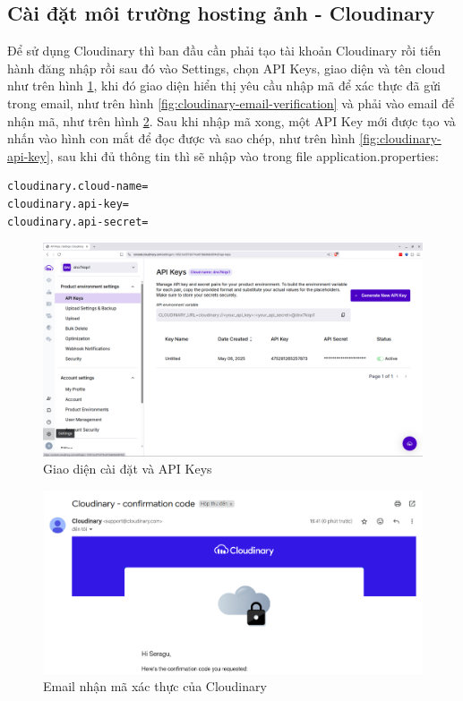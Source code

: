 \documentclass[../BTL.tex]{subfiles}
\begin{document}
\subsection{ Cài đặt môi trường hosting ảnh - Cloudinary}
Để sử dụng Cloudinary thì ban đầu cần phải tạo tài khoản Cloudinary rồi tiến hành đăng nhập rồi sau đó vào Settings, chọn API Keys, giao diện và tên cloud như trên hình \ref{fig:cloudinary-setting}, khi đó giao diện hiển thị yêu cầu nhập mã để xác thực đã gửi trong email, như trên hình \ref{fig:cloudinary-email-verification} và phải vào email để nhận mã, như trên hình \ref{fig:cloudinary-email-code}. Sau khi nhập mã xong, một API Key mới được tạo và nhấn vào hình con mắt để đọc được và sao chép, như trên hình \ref{fig:cloudinary-api-key}, sau khi đủ thông tin thì sẽ nhập vào trong file application.properties:
\begin{verbatim}
cloudinary.cloud-name=
cloudinary.api-key=
cloudinary.api-secret=
\end{verbatim}
\begin{figure}
    \centering
    \includegraphics[width=1\linewidth]{Hinhve/cloudinary-setting.png}
    \caption{ Giao diện cài đặt và API Keys}
    \label{fig:cloudinary-setting}
\end{figure}
\begin{figure}
    \centering
    \includegraphics[width=1\linewidth]{Hinhve/cloudinary-email-code.png}
    \caption{ Email nhận mã xác thực của Cloudinary}
    \label{fig:cloudinary-email-code}
\end{figure}
\end{document}
